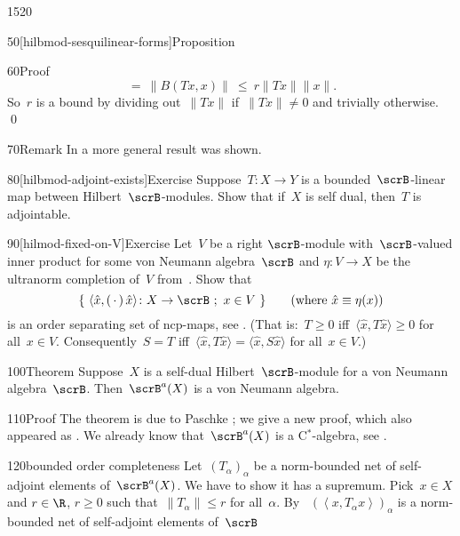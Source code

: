 \begin{parsec}{1520}
\begin{point}{50}[hilbmod-sesquilinear-forms]{Proposition}
\begin{point}{60}{Proof}
\begin{equation*}
            \ =\  \| B (Tx, x) \|
            \ \leq\  r \|Tx\|\|x\|.
\end{equation*}
So~$r$ is a bound
    by dividing out~$\| T x \|$
    if~$\| Tx \| \neq 0$
    and trivially otherwise.  \qed
\end{point}
\begin{point}{70}{Remark}%
In  a more general result was shown.
\end{point}
\end{point}
\begin{point}{80}[hilbmod-adjoint-exists]{Exercise}%
Suppose~$T\colon X \to Y$ is a bounded~$\scrB$-linear map between
    Hilbert~$\scrB$-modules.
Show that if~$X$ is self dual,
    then~$T$ is adjointable. \cite[prop.~3.4]{paschke}
\end{point}
\begin{point}{90}[hilmod-fixed-on-V]{Exercise}%
Let~$V$ be a right $\scrB$-module with~$\scrB$-valued inner product
        for some von Neumann algebra~$\scrB$ and
    $\eta\colon V \to X$ be the ultranorm completion of~$V$
    from~.
Show that
\begin{equation*}
    \{\ \langle \hat{x}, (\,\cdot\,)\, \hat{x}\rangle \colon X \to \scrB \ ;\ x \in V\  \} \qquad \text{(where $\hat{x} \equiv \eta(x)$)}
\end{equation*}
is an order separating set of ncp-maps, see .
    (That is:~$T \geq 0$ iff~$\langle \hat{x}, T \hat{x}\rangle \geq 0$
    for all~$x \in V$.
    Consequently~$S = T$ iff~$\langle \hat{x}, T \hat{x} \rangle 
    = \langle \hat{x}, S \hat{x} \rangle$ for all~$x \in V$.)
\end{point}
\begin{point}{100}{Theorem}%
Suppose~$X$ is a self-dual Hilbert~$\scrB$-module
    for a von Neumann algebra~$\scrB$.
Then~$\scrB^a(X)$ is a von Neumann algebra.
\begin{point}{110}{Proof}%
The theorem is due to Paschke \cite[prop.~3.10]{paschke};
    we give a new proof, which also appeared as .
We already know that~$\scrB^a(X)$ is a C$^*$-algebra, see .
\begin{point}{120}{bounded order completeness}%
Let~$(T_\alpha)_\alpha$ be a norm-bounded net of self-adjoint elements
    of~$\scrB^a(X)$.  We have to show it has a supremum.
Pick~$x\in X$ and  $r\in \R$, $r\geq0 $
such that~$\|T_\alpha\| \leq r$ for all~$\alpha$.
By ~$(\left<x,T_\alpha x\right>)_\alpha$
    is a norm-bounded net of self-adjoint elements of~$\scrB$

\end{point}
\end{point}
\end{point}
\end{parsec}
